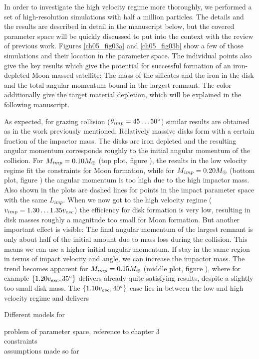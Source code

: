 In order to investigate the high velocity regime more thoroughly, we performed a set of high-resolution simulations with half a million particles. The details and the results are described in detail in the manuscript below, but the covered parameter space will be quickly discussed to put into the context with the review of previous work. Figures \ref{ch05_fig03a} and \ref{ch05_fig03b} show a few of those simulations and their location in the parameter space. The individual points also give the key results which give the potential for successful formation of an iron-depleted Moon massed satellite: The mass of the silicates and the iron in the disk and the total angular momentum bound in the largest remnant. The color additionally give the target material depletion, which will be explained in the following manuscript.

As expected, for grazing collision ($\theta_{imp} = 45 \dots 50 ^\circ$) similar results are obtained as in the work previously mentioned. Relatively massive disks form with a certain fraction of the impactor mass. The disks are iron depleted and the resulting angular momentum corresponds roughly to the initial angular momentum of the collision. For $M_{imp} = 0.10 M_{\oplus}$ (top plot, figure \label{ch05_fig03a}), the results in the low velocity regime fit the constraints for Moon formation, while for $M_{imp} = 0.20 M_{\oplus}$ (bottom plot, figure \label{ch05_fig03a}) the angular momentum is too high due to the high impactor mass. Also shown in the plots are dashed lines for points in the impact parameter space with the same $L_{imp}$. When we now got to the high velocity regime ($v_{imp} = 1.30 \dots 1.35 v_{esc}$) the efficiency for disk formation is very low, resulting in disk masses roughly a magnitude too small for Moon formation. But another important effect is visible: The final angular momentum of the largest remnant is only about half of the initial amount due to mass loss during the collision. This means we can use a higher initial angular momentum. If stay in the same region in terms of impact velocity and angle, we can increase the impactor mass. The trend becomes apparent for $M_{imp} = 0.15 M_{\oplus}$ (middle plot, figure \label{ch05_fig03a}), where for example $\{1.20 v_{esc}, 35 ^\circ \}$ delivers already quite satisfying results, despite a slightly too small disk mass. The $\{1.10 v_{esc}, 40 ^\circ \}$ case lies in between the low and high velocity regime and delivers 

Different models for 

problem of parameter space, reference to chapter 3\\
constraints\\
assumptions made so far\\

